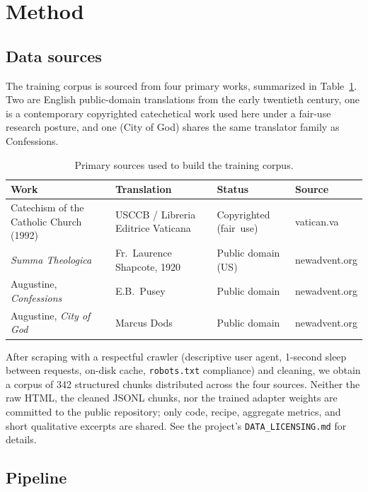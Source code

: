 \section{Method}
\label{sec:method}

\subsection{Data sources}
\label{sec:data}

The training corpus is sourced from four primary works, summarized in
Table~\ref{tab:sources}. Two are English public-domain translations from
the early twentieth century, one is a contemporary copyrighted catechetical
work used here under a fair-use research posture, and one (City of God)
shares the same translator family as Confessions.

\begin{table}[H]
\centering
\caption{Primary sources used to build the training corpus.}
\label{tab:sources}
\small
\setlength{\tabcolsep}{6pt}
\renewcommand{\arraystretch}{1.2}
\begin{tabular}{p{4.4cm} p{4.0cm} p{3.2cm} p{2.0cm}}
\toprule
\textbf{Work} & \textbf{Translation} & \textbf{Status} & \textbf{Source} \\
\midrule
Catechism of the Catholic Church (1992) & USCCB / Libreria Editrice Vaticana & Copyrighted \mbox{(fair use)} & vatican.va \\
\emph{Summa Theologica} & Fr.~Laurence \mbox{Shapcote}, 1920 & Public domain (US) & newadvent.org \\
Augustine, \emph{Confessions} & E.B.~Pusey & Public domain & newadvent.org \\
Augustine, \emph{City of God} & Marcus Dods & Public domain & newadvent.org \\
\bottomrule
\end{tabular}
\end{table}

After scraping with a respectful crawler (descriptive user agent,
1-second sleep between requests, on-disk cache, \texttt{robots.txt}
compliance) and cleaning, we obtain a corpus of 342 structured chunks
distributed across the four sources. Neither the raw HTML, the cleaned
JSONL chunks, nor the trained adapter weights are committed to the public
repository; only code, recipe, aggregate metrics, and short qualitative
excerpts are shared. See the project's \texttt{DATA\_LICENSING.md} for
details.

\subsection{Pipeline}
\label{sec:pipeline}

